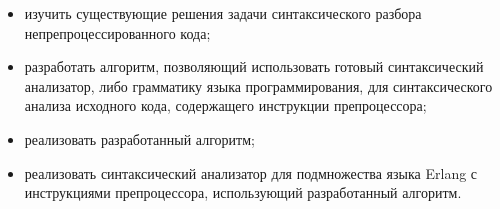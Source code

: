 \begin{itemize}

\item изучить существующие решения задачи синтаксического разбора непрепроцессированного кода;

\item разработать алгоритм, позволяющий использовать готовый синтаксический анализатор, либо грамматику языка программирования, для синтаксического анализа исходного кода, содержащего инструкции препроцессора;

\item реализовать разработанный алгоритм;

\item реализовать синтаксический анализатор для подмножества языка Erlang с инструкциями препроцессора, использующий разработанный алгоритм.

\end{itemize}




